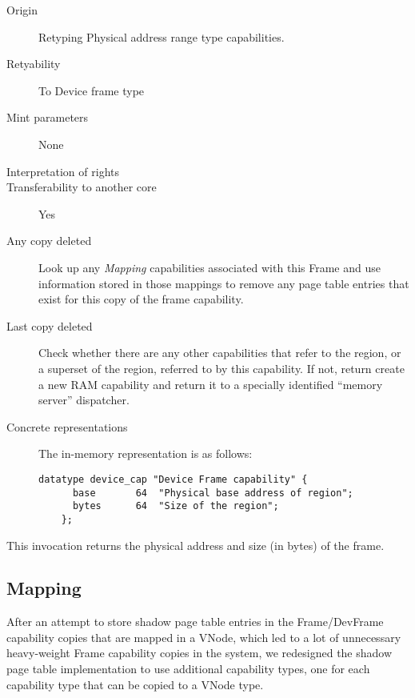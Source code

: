 \begin{description}
\item[Origin] Retyping Physical address range type capabilities.
  
\item[Retyability] To Device frame type
  
\item[Mint parameters] None
  
\item[Interpretation of rights] 
  
\item[Transferability to another core] Yes

\item[Any copy deleted] Look up any \emph{Mapping} capabilities associated
  with this Frame and use information stored in those mappings to remove any
  page table entries that exist for this copy of the frame capability.

\item[Last copy deleted] Check whether there are any other capabilities that
  refer to the region, or a superset of the region, referred to by this
    capability. If not, return create a new RAM capability and return it to a
    specially identified ``memory server'' dispatcher.
  
\item[Concrete representations] The in-memory representation is as follows:
  
  \begin{lstlisting}[language=Mackerel]
    datatype device_cap "Device Frame capability" {
      base       64  "Physical base address of region";
      bytes      64  "Size of the region";
    };
  \end{lstlisting}
\end{description}  

 This invocation returns the physical
address and size (in bytes) of the frame.

\subsection{Mapping}
After an attempt to store shadow page table entries in the Frame/DevFrame
capability copies that are mapped in a VNode, which led to a lot of
unnecessary heavy-weight Frame capability copies in the system, we redesigned
the shadow page table implementation to use additional capability types, one
for each capability type that can be copied to a VNode type.

